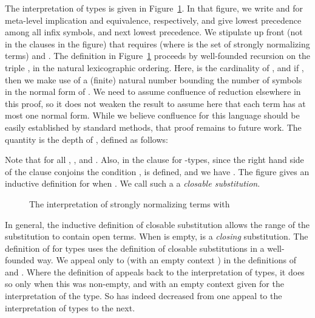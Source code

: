 \documentclass[copyright]{eptcs}
\begin{document}
The interpretation of types is given in Figure~\ref{fig:interp}.  In
that figure, we write  and  for meta-level
implication and equivalence, respectively, and give 
lowest precedence among all infix symbols, and  next lowest
precedence.  We stipulate up front (not in the clauses in the figure)
that  requires  (where  is the
set of strongly normalizing terms) and .  The
definition in Figure~\ref{fig:interp} proceeds by well-founded
recursion on the triple , in the natural
lexicographic ordering.  Here,  is the cardinality of
, and if , then we make use of a
(finite) natural number  bounding the number of symbols in the
normal form of .  We need to assume confluence of reduction
elsewhere in this proof, so it does not weaken the result to assume
here that each term has at most one normal form.  While we believe
confluence for this language should be easily established by standard
methods, that proof remains to future work.  The quantity  is
the depth of , defined as follows:

\noindent Note that  for all , , and
.  Also, in the clause for -types, since the right hand
side of the clause conjoins the condition ,  is
defined, and we have .  The figure gives an
inductive definition for when .  We
call such a  a \emph{closable substitution}.

\begin{figure}

\caption{The interpretation  of strongly normalizing terms with }
\label{fig:interp}
\end{figure}

In general, the inductive definition of closable substitution
 allows the range of the
substitution to contain open terms.  When  is empty, 
is a \emph{closing} substitution.  The definition of 
for types uses the definition of closable substitutions in a
well-founded way.  We appeal only to  (with an empty
context ) in the definitions of  and
.  Where the definition of
 appeals back to the interpretation of types,
it does so only when this  was non-empty, and with an empty
context given for the interpretation of the type.  So  has
indeed decreased from one appeal to the interpretation of types to the
next.

\begin{comment}
The notion of closable substitution depends on the equally important
concept of a \emph{closable} term , with notation
.  Intuitively, a term  in the
interpretation of a type  in context  is closable iff
being in the interpretation is preserved for all nontrivial closing
substitutions.

Finally, the clause for -types is complicated by two issues.
First, -types are parameterized by a type, and so we must ensure
that subdata are reducible at the appropriate types.  Second,
-types are indexed (by the length of the list), and so we must
specify that the length is equal to  in the first case; and equal
to some  that can serve as the length of the sublist (), in
the second.  These equalities are stated using .
\end{comment}
\end{document}
